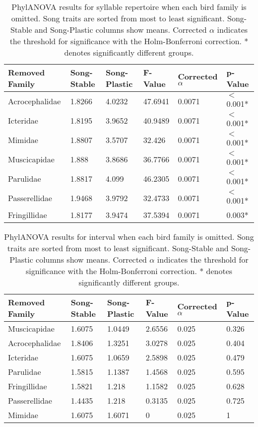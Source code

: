\documentclass[a4paper,12pt]{article}
\begin{document}
\begin{table}[ht]
\caption{PhylANOVA results for syllable repertoire when each bird family is omitted. Song traits are sorted from most to least significant. Song-Stable and Song-Plastic columns show means. Corrected $\alpha$ indicates the threshold for significance with the Holm-Bonferroni correction. * denotes significantly different groups.}
\centering
\begin{tabular}{llllll}
  \hline
Removed Family & Song-Stable & Song-Plastic & F-Value & Corrected $\alpha$ & p-Value \\ 
  \hline
Acrocephalidae & 1.8266 & 4.0232 & 47.6941 & 0.0071 & $<$0.001* \\ 
  Icteridae & 1.8195 & 3.9652 & 40.9489 & 0.0071 & $<$0.001* \\ 
  Mimidae & 1.8807 & 3.5707 & 32.426 & 0.0071 & $<$0.001* \\ 
  Muscicapidae & 1.888 & 3.8686 & 36.7766 & 0.0071 & $<$0.001* \\ 
  Parulidae & 1.8817 & 4.099 & 46.2305 & 0.0071 & $<$0.001* \\ 
  Passerellidae & 1.9468 & 3.9792 & 32.4733 & 0.0071 & $<$0.001* \\ 
  Fringillidae & 1.8177 & 3.9474 & 37.5394 & 0.0071 & 0.003* \\ 
   \hline
\end{tabular}
\end{table}

\begin{table}[ht]
\caption{PhylANOVA results for interval when each bird family is omitted. Song traits are sorted from most to least significant. Song-Stable and Song-Plastic columns show means. Corrected $\alpha$ indicates the threshold for significance with the Holm-Bonferroni correction. * denotes significantly different groups.}
\centering
\begin{tabular}{llllll}
  \hline
Removed Family & Song-Stable & Song-Plastic & F-Value & Corrected $\alpha$ & p-Value \\ 
  \hline
Muscicapidae & 1.6075 & 1.0449 & 2.6556 & 0.025 & 0.326 \\ 
  Acrocephalidae & 1.8406 & 1.3251 & 3.0278 & 0.025 & 0.404 \\ 
  Icteridae & 1.6075 & 1.0659 & 2.5898 & 0.025 & 0.479 \\ 
  Parulidae & 1.5815 & 1.1387 & 1.4568 & 0.025 & 0.595 \\ 
  Fringillidae & 1.5821 & 1.218 & 1.1582 & 0.025 & 0.628 \\ 
  Passerellidae & 1.4435 & 1.218 & 0.3135 & 0.025 & 0.725 \\ 
  Mimidae & 1.6075 & 1.6071 & 0 & 0.025 & 1 \\ 
   \hline
\end{tabular}
\end{table}
\end{document}
